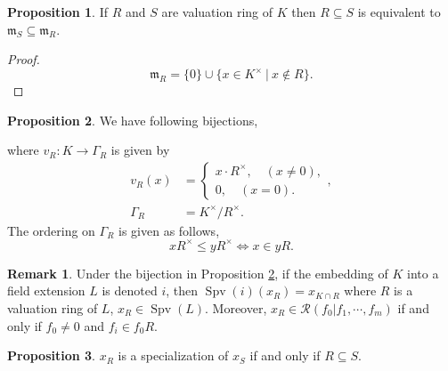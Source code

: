 \documentclass[10pt]{article}
\numberwithin{equation}{section}
\theoremstyle{definition}
\newtheorem{proposition}{Proposition}[subsection]
\newtheorem{remark}{Remark}[subsection]
\DeclareMathOperator{\Spv}{Spv}
\newcommand{\m}[0]{\mathfrak{m}}
\newcommand{\cR}[0]{\mathcal{R}}
\newcommand{\sep}[0]{\:|\:}
\newcommand{\ab}[1]{\vert #1 \vert}
\begin{document}
\begin{proposition}
    \label{fact_7_2}
    If $R$ and $S$ are valuation ring of $K$ then $R\subseteq S$ is equivalent to $\m_S\subseteq\m_R$.
\end{proposition}
\begin{proof}
    \begin{equation*}
        \m_R=\{0\}\cup\{x\in K^\times\sep x\not\in R\}.
    \end{equation*}
\end{proof}
\begin{proposition}
    \label{proposition_7_1}
    We have following bijections,
    \begin{center}
    \end{center}
    where $v_R:K\to\Gamma_R$ is given by
    \begin{align*}
        v_R(x) &= \begin{cases}
            x\cdot R^\times ,\quad(x\not=0),\\
            0,\quad(x=0).
        \end{cases},\\
        \Gamma_R &= K^\times/R^\times.
    \end{align*}
    The ordering on $\Gamma_R$ is given as follows,
    \begin{equation*}
        xR^\times\leq yR^\times \iff x\in yR.
    \end{equation*}
\end{proposition}

\begin{remark}
    \label{fact_8_2}
    Under the bijection in Proposition \ref{proposition_7_1}, if the embedding of $K$ into a field extension $L$ is denoted $i$, then $\Spv(i)(x_R) = x_{K\cap R}$ where $R$ is a valuation ring of $L$, $x_R\in\Spv(L)$. Moreover, $x_R\in\cR(f_0|f_1,\cdots,f_m)$ if and only if $f_0\not=0$ and $f_i\in f_0R$.
\end{remark}

\begin{proposition}
    \label{fact_8_3}
    $x_R$ is a specialization of $x_S$ if and only if $R\subseteq S$.
\end{proposition}
\end{document}
